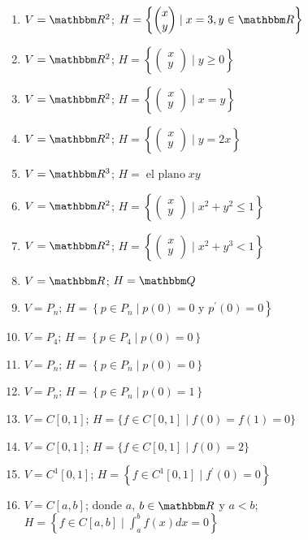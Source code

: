 \begin{enumerate}[resume]
    \item $V=\RR[2]$; $H=\left\{ \begin{pmatrix} x \\ y \end{pmatrix} \mid x=3, y \in \RR \right\}$
    \item $V=\RR[2]$; $H=\left\{ \begin{pmatrix} x \\ y \end{pmatrix} \mid y \geq 0 \right\}$\newpage
    \item $V=\RR[2]$; $H=\left\{ \begin{pmatrix} x \\ y \end{pmatrix} \mid x=y \right\}$
    \item $V=\RR[2]$; $H=\left\{ \begin{pmatrix} x \\ y \end{pmatrix} \mid y=2 x \right\}$
    \item $V=\RR[3]$; $H = \operatorname{el~plano} x y$
    \item $V=\RR[2]$; $H=\left\{ \begin{pmatrix} x \\ y \end{pmatrix} \mid x^{2}+y^{2} \leq 1\right\}$
    \item $V=\RR[2]$; $H=\left\{ \begin{pmatrix} x \\ y \end{pmatrix} \mid x^{2}+y^{3}<1\right\}$
    \item $V=\RR$; $H=\QQ$
    \item $V=P_{n}$; $H=\left\{p \in P_{n}\mid p(0)=0\right.$ y $\left.p^{\prime}(0)=0\right\}$
    \item $V=P_{4}$; $H=\left\{p \in P_{4}\mid p(0)=0\right\}$
    \item $V=P_{n}$; $H=\left\{p \in P_{n}\mid p(0)=0\right\}$
    \item $V=P_{n}$; $H=\left\{p \in P_{n}\mid p(0)=1\right\}$
    \item $V=C[0,1]$; $H=\{f \in C[0,1]\mid f(0)=f(1)=0\}$
    \item $V=C[0,1]$; $H=\{f \in C[0,1]\mid f(0)=2\}$
    \item $V=C^{1}[0,1]$; $H=\left\{f \in C^{1}[0,1]\mid f^{\prime}(0)=0\right\}$
    \item $V=C[a, b]$; donde $a$, $b \in \RR$ y $a<b$; $\displaystyle H=\left\{f \in C[a, b]\mid \int_{a}^{b} f(x) d x=0\right\}$

\end{enumerate}

